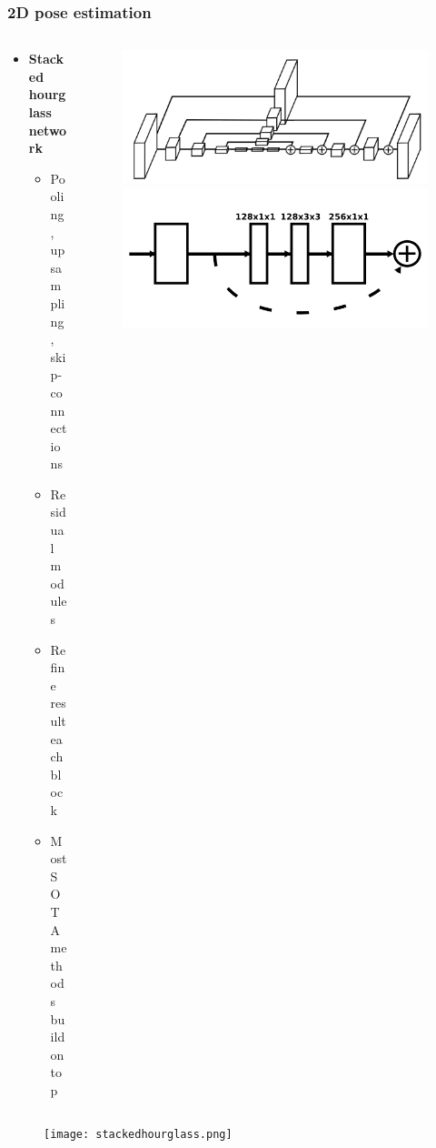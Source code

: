 \documentclass[9pt]{beamer}
\newenvironment{myframe}[1][]{%
\begin{frame}%
\frametitle{#1}
\setcounter{footnote}{0}


}{%
\end{frame}%
}
\begin{document}
\begin{myframe}[2D pose estimation]
    \begin{columns}[T]
        \begin{column}{.48\textwidth}
            \begin{itemize}
                \vspace{25px}
                \item \textbf{Stacked hourglass network \footnotemark}
                  \begin{itemize}
                    \item Pooling, upsampling, skip-connections
                    \item Residual modules~\footnotemark
                    \item Refine result each block
                    \item Most SOTA methods build on top
                  \end{itemize}
            \end{itemize}
        \end{column}
        \begin{column}{.48\textwidth}
            \begin{figure}
                \includegraphics[width=.75\textwidth]{single-hourglass.png}
                \includegraphics[width=.75\textwidth]{residualmodule.png}
            \end{figure}
        \end{column}
    \end{columns}
    \begin{figure}
        \texttt{[image: stackedhourglass.png]}
    \end{figure}
\end{myframe}
\end{document}
